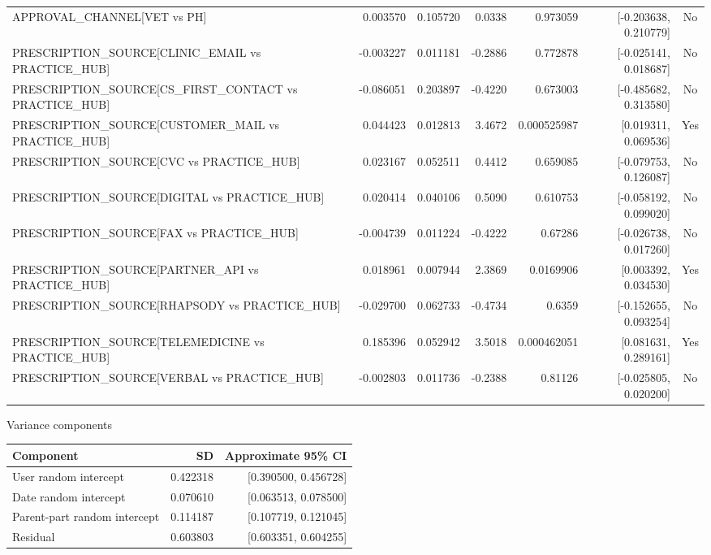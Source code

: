 \documentclass[
]{article}
\newcounter{none} %
\begin{document}
{\begin{longtable}[]{@{}lrrrrrc@{}}
APPROVAL\_CHANNEL{[}VET vs PH{]} & 0.003570 & 0.105720 & 0.0338 &
0.973059 & {[}-0.203638, 0.210779{]} & No \\
PRESCRIPTION\_SOURCE{[}CLINIC\_EMAIL vs PRACTICE\_HUB{]} & -0.003227 &
0.011181 & -0.2886 & 0.772878 & {[}-0.025141, 0.018687{]} & No \\
PRESCRIPTION\_SOURCE{[}CS\_FIRST\_CONTACT vs PRACTICE\_HUB{]} &
-0.086051 & 0.203897 & -0.4220 & 0.673003 & {[}-0.485682, 0.313580{]} &
No \\
PRESCRIPTION\_SOURCE{[}CUSTOMER\_MAIL vs PRACTICE\_HUB{]} & 0.044423 &
0.012813 & 3.4672 & 0.000525987 & {[}0.019311, 0.069536{]} & Yes \\
PRESCRIPTION\_SOURCE{[}CVC vs PRACTICE\_HUB{]} & 0.023167 & 0.052511 &
0.4412 & 0.659085 & {[}-0.079753, 0.126087{]} & No \\
PRESCRIPTION\_SOURCE{[}DIGITAL vs PRACTICE\_HUB{]} & 0.020414 & 0.040106
& 0.5090 & 0.610753 & {[}-0.058192, 0.099020{]} & No \\
PRESCRIPTION\_SOURCE{[}FAX vs PRACTICE\_HUB{]} & -0.004739 & 0.011224 &
-0.4222 & 0.67286 & {[}-0.026738, 0.017260{]} & No \\
PRESCRIPTION\_SOURCE{[}PARTNER\_API vs PRACTICE\_HUB{]} & 0.018961 &
0.007944 & 2.3869 & 0.0169906 & {[}0.003392, 0.034530{]} & Yes \\
PRESCRIPTION\_SOURCE{[}RHAPSODY vs PRACTICE\_HUB{]} & -0.029700 &
0.062733 & -0.4734 & 0.6359 & {[}-0.152655, 0.093254{]} & No \\
PRESCRIPTION\_SOURCE{[}TELEMEDICINE vs PRACTICE\_HUB{]} & 0.185396 &
0.052942 & 3.5018 & 0.000462051 & {[}0.081631, 0.289161{]} & Yes \\
PRESCRIPTION\_SOURCE{[}VERBAL vs PRACTICE\_HUB{]} & -0.002803 & 0.011736
& -0.2388 & 0.81126 & {[}-0.025805, 0.020200{]} & No \\
\end{longtable}
}

Variance components

{\def\LTcaptype{none} %
\begin{longtable}[]{@{}lrr@{}}
\toprule\noalign{}
Component & SD & Approximate 95\% CI \\
\midrule\noalign{}
\endhead
\bottomrule\noalign{}
\endlastfoot
User random intercept & 0.422318 & {[}0.390500, 0.456728{]} \\
Date random intercept & 0.070610 & {[}0.063513, 0.078500{]} \\
Parent-part random intercept & 0.114187 & {[}0.107719, 0.121045{]} \\
Residual & 0.603803 & {[}0.603351, 0.604255{]} \\
\end{longtable}
}
\end{document}
